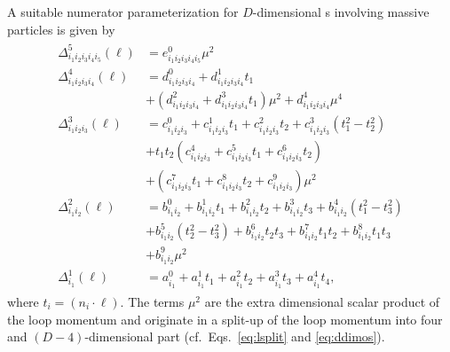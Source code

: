 A suitable numerator parameterization for $D$-dimensional \ola s involving massive particles is given by \cite{Ellis:2007br,Ellis:2008ir}
\begin{align}\label{eq:intparam}
\begin{split}
  \Delta_{i_1i_2i_3i_4i_5}^5(\ell) &= e^0_{i_1i_2i_3i_4i_5}\mu^2\\
  \Delta_{i_1i_2i_3i_4}^4(\ell) &=
  d^0_{i_1i_2i_3i_4}+d^1_{i_1i_2i_3i_4}t_1\\
&+(d^2_{i_1i_2i_3i_4}+d^3_{i_1i_2i_3i_4}t_1)\mu^2+d^4_{i_1i_2i_3i_4}\mu^4\\
  \Delta_{i_1i_2i_3}^3(\ell) &=
  c^0_{i_1i_2i_3}+c^1_{i_1i_2i_3}t_1+c^2_{i_1i_2i_3}t_2+c^3_{i_1i_2i_3}(t_1^2-t^2_2)\\
&+t_1t_2(c^4_{i_1i_2i_3}
  +c^5_{i_1i_2i_3}t_1+c^6_{i_1i_2i_3}t_2)\\
&+(c^7_{i_1i_2i_3}t_1+c^8_{i_1i_2i_3}t_2+c^9_{i_1i_2i_3})\mu^2\\
  \Delta_{i_1i_2}^2(\ell) &=
  b^0_{i_1i_2}+b^1_{i_1i_2}t_1+b^2_{i_1i_2}t_2+b^3_{i_1i_2}t_3+b^4_{i_1i_2}(t_1^2-t_3^2)\\
&
+b^5_{i_1i_2}(t_2^2-t_3^2)+b^6_{i_1i_2}t_2t_3+b^7_{i_1i_2}t_1t_2+b^8_{i_1i_2}t_1t_3\\
&+b^9_{i_1i_2}\mu^2\\
  \Delta_{i_1}^1(\ell) &=
  a^0_{i_1}+a^1_{i_1}t_1+a^2_{i_1}t_2+a^3_{i_1}t_3+a^4_{i_1}t_4,
\end{split}
\end{align}
where $t_i= (n_i\cdot \ell)$. The terms $\mu^2$ are the extra dimensional
scalar product of the loop momentum and originate in a split-up of the
loop momentum into four and $(D-4)$-dimensional part
(cf.~Eqs.~\eqref{eq:lsplit} and \eqref{eq:ddimos}).


